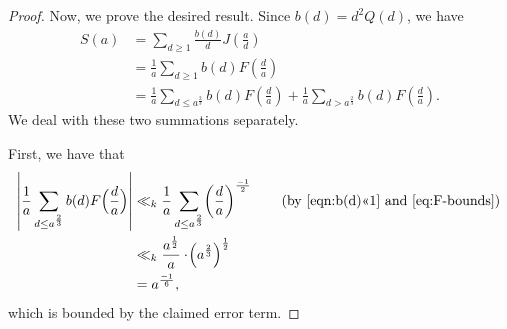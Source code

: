 \documentclass[12pt,letterpaper,reqno]{amsart}
\theoremstyle{plain}
\theoremstyle{definition}
\numberwithin{equation}{section}
\numberwithin{figure}{section}
\numberwithin{table}{section}
\newcommand{\lrabs}[1]{\!\left\lvert #1 \right\lvert}
\newcommand{\lrp}[1]{\!\left(#1\right)}
\begin{document}
\begin{proof}
Now, we prove the desired result. Since $b(d)=d^2Q(d)$, we have
\begin{align} \label{eq:S-b-expression}
S(a)
&=
\sum_{d\ge1} \frac{b(d)}{d} J\lrp{\frac{a}{d}}
\\
&=
\frac1a\sum_{d\ge 1}b(d)F\lrp{\frac{d}{a}} \\
&= 
\frac1a\sum_{d\le a^{\frac{2}{3}}}b(d)F\lrp{\frac{d}{a}}  + \frac1a\sum_{d> a^{\frac{2}{3}}}b(d)F\lrp{\frac{d}{a}}.
\end{align}
We deal with these two summations separately.


First, we have that
\begin{align} \label{eq:small-d}
\lrabs{\frac1a\sum_{d\le a^{\frac{2}{3}}}b(d) F\Big(\frac{d}{a}\Big)}
&\ll_k
\frac1{a}\sum_{d\le a^{\frac{2}{3}}}\lrp{\frac{d}{a}}^{\frac{-1}{2}} 
\qquad \text{(by \eqref{eqn:b(d)<<1} and \eqref{eq:F-bounds})}
\\
&\ll_k
\frac{a^{\frac{1}{2}}}{a} \cdot 
\lrp{a^{\frac{2}{3}}}^{\frac{1}{2}} 
\\
&=
a^{\frac{-1}{6}},
\end{align}
which is bounded by the claimed error term.

















\end{proof}
\end{document}
